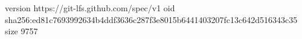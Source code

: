 version https://git-lfs.github.com/spec/v1
oid sha256:ed81c7693992634b4ddf3636c287f3e8015b6441403207fc13c642d516343c35
size 9757

